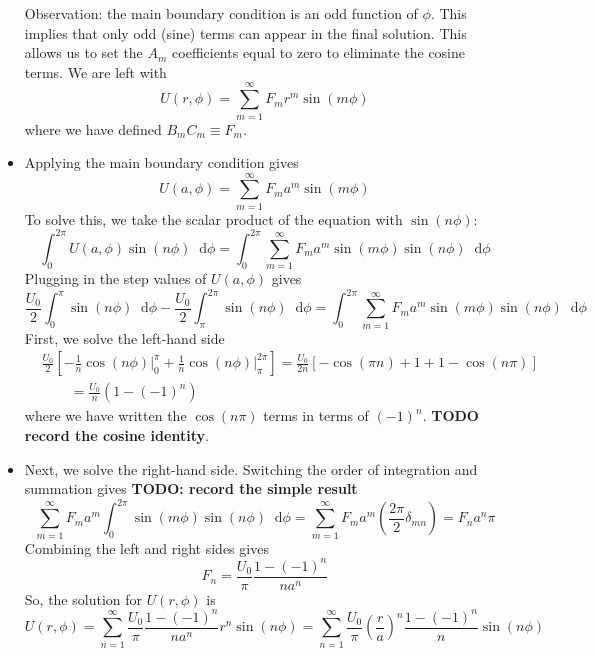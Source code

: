 \documentclass[11pt, a4paper]{article}
\newcommand{\diff}{\mathop{}\!\mathrm{d}} %
\begin{document}
\begin{itemize}
	Observation: the main boundary condition is an odd function of $ \phi $. This implies that only odd (sine) terms can appear in the final solution. This allows us to set the $ A_{m} $ coefficients equal to zero to eliminate the cosine terms. We are left with
	\begin{equation*}
		U(r, \phi) = \sum_{m=1}^{\infty} F_{m}r^{m} \sin (m\phi)
	\end{equation*}
	where we have defined $ B_{m}C_{m} \equiv F_{m} $. 
	
	\item Applying the main boundary condition gives
	\begin{equation*}
		U(a, \phi) = \sum_{m=1}^{\infty} F_{m}a^{m} \sin (m\phi)
	\end{equation*} 
	To solve this, we take the scalar product of the equation with $ \sin(n \phi) $: 
	\begin{equation*}
		\int_{0}^{2\pi} U(a, \phi)\sin(n \phi) \diff \phi =  \int_{0}^{2\pi} \sum_{m=1}^{\infty} F_{m}a^{m} \sin (m\phi) \sin(n \phi) \diff \phi
	\end{equation*}
	Plugging in the step values of $ U(a, \phi) $ gives
	\begin{equation*}
		\frac{U_{0}}{2}\int_{0}^{\pi}\sin(n \phi) \diff \phi - \frac{U_{0}}{2}\int_{\pi}^{2\pi}\sin(n \phi) \diff \phi  =  \int_{0}^{2\pi} \sum_{m=1}^{\infty} F_{m}a^{m} \sin (m\phi) \sin(n \phi) \diff \phi
	\end{equation*}
	First, we solve the left-hand side
	\begin{align*}
		&\frac{U_{0}}{2}\left[-\frac{1}{n}\cos(n\phi)\big |_{0}^{\pi} + \frac{1}{n}\cos (n\phi)\big |_{\pi}^{2\pi} \right] = \frac{U_{0}}{2n}\left[-\cos(\pi n) + 1 + 1 - \cos(n\pi)\right]\\
		&{}\qquad = \frac{U_{0}}{n}\left(1 - (-1)^{n}\right)
	\end{align*}
	where we have written the $ \cos(n\pi) $ terms in terms of $ (-1)^{n} $. \textbf{TODO record the cosine identity}.
	
	\item Next, we solve the right-hand side. Switching the order of integration and summation gives \textbf{TODO: record the simple result}
	\begin{equation*}
		  \sum_{m=1}^{\infty} F_{m}a^{m} \int_{0}^{2\pi}  \sin (m\phi) \sin(n \phi) \diff \phi = \sum_{m=1}^{\infty} F_{m}a^{m}\left (\frac{2\pi}{2}\delta_{mn} \right ) = F_{n}a^{n} \pi
	\end{equation*}
	Combining the left and right sides gives
	\begin{equation*}
		F_{n} = \frac{U_{0}}{\pi}\frac{1 - (-1)^{n}}{n a^{n}}
	\end{equation*}
	So, the solution for $ U(r, \phi) $ is
	\begin{equation*}
		U(r, \phi) = \sum_{n = 1}^{\infty} \frac{U_{0}}{\pi}\frac{1 - (-1)^{n}}{n a^{n}} r^{n}\sin(n\phi) = \sum_{n = 1}^{\infty} \frac{U_{0}}{\pi}\left(\frac{r}{a}\right)^{n} \frac{1 - (-1)^{n}}{n }\sin(n\phi)
	\end{equation*}
	

\end{itemize}
\end{document}
